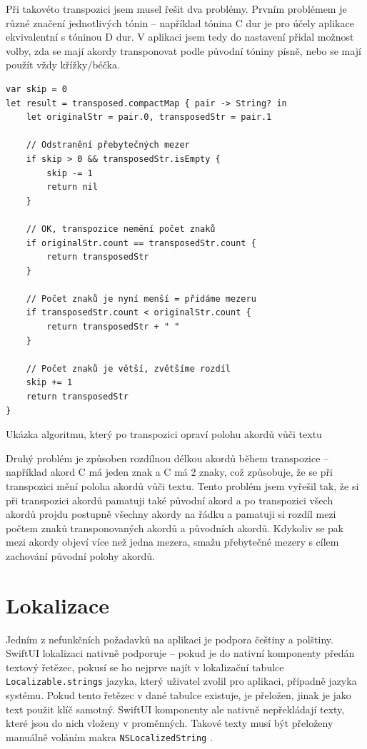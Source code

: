 Při takovéto transpozici jsem musel řešit dva problémy. Prvním problémem je různé značení jednotlivých tónin -- například tónina C\musSharp{} dur je pro účely aplikace ekvivalentní s tóninou D\musFlat{} dur. V aplikaci jsem tedy do nastavení přidal možnost volby, zda se mají akordy transponovat podle původní tóniny písně, nebo se mají použít vždy křížky/béčka.

\begin{listing}[H]
\begin{verbatim}
var skip = 0
let result = transposed.compactMap { pair -> String? in
    let originalStr = pair.0, transposedStr = pair.1

    // Odstranění přebytečných mezer
    if skip > 0 && transposedStr.isEmpty {
        skip -= 1
        return nil
    }
    
    // OK, transpozice nemění počet znaků
    if originalStr.count == transposedStr.count {
        return transposedStr
    }
    
    // Počet znaků je nyní menší = přidáme mezeru
    if transposedStr.count < originalStr.count {
        return transposedStr + " "
    }
    
    // Počet znaků je větší, zvětšíme rozdíl
    skip += 1
    return transposedStr
}
\end{verbatim}
\caption{Ukázka algoritmu, který po transpozici opraví polohu akordů vůči textu}
\end{listing}

Druhý problém je způsoben rozdílnou délkou akordů během transpozice -- například akord C má jeden znak a C\musSharp{} má 2 znaky, což způsobuje, že se při transpozici mění poloha akordů vůči textu. Tento problém jsem vyřešil tak, že si při transpozici akordů pamatuji také původní akord a po transpozici všech akordů projdu postupně všechny akordy na řádku a pamatuji si rozdíl mezi počtem znaků transponovaných akordů a původních akordů. Kdykoliv se pak mezi akordy objeví více než jedna mezera, smažu přebytečné mezery s cílem zachování původní polohy akordů.

\section{Lokalizace}

Jedním z nefunkčních požadavků na aplikaci je podpora češtiny a polštiny. SwiftUI lokalizaci nativně podporuje -- pokud je do nativní komponenty předán textový řetězec, pokusí se ho nejprve najít v lokalizační tabulce \texttt{Localizable.strings} jazyka, který uživatel zvolil pro aplikaci, případně jazyka systému. Pokud tento řetězec v dané tabulce existuje, je přeložen, jinak je jako text použit klíč samotný. SwiftUI komponenty ale nativně nepřekládají texty, které jsou do nich vloženy v proměnných. Takové texty musí být přeloženy manuálně voláním makra \texttt{NSLocalizedString} \cite{swift-localizedstring}.
